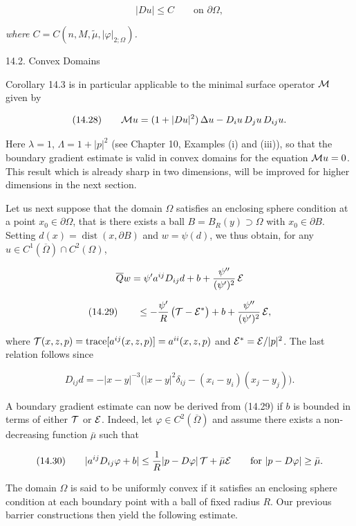 \begin{equation}
|Du| \leq C \qquad \text{on } \partial \Omega,
\tag{14.27}
\end{equation}

\emph{where $C = C(n, M, \tilde{\mu}, |\varphi|_{2;\Omega})$.}


14.2. Convex Domains

Corollary 14.3 is in particular applicable to the minimal surface operator \(\mathcal{M}\)
given by

\[
(14.28)\qquad \mathcal{M} u=(1+|Du|^2)\,\Delta u-D_i u\,D_j u\,D_{ij}u.
\]

Here \(\lambda=1\), \(\Lambda=1+|p|^2\) (see Chapter 10, Examples (i) and (iii)), so that the
boundary gradient estimate is valid in convex domains for the equation \(\mathcal{M} u=0\).
This result which is already sharp in two dimensions, will be improved for higher
dimensions in the next section.

Let us next suppose that the domain \(\Omega\) satisfies an enclosing sphere condition at
a point \(x_0\in\partial\Omega\), that is there exists a ball \(B=B_R(y)\supset\Omega\) with \(x_0\in\partial B\). Setting
\(d(x)=\operatorname{dist}(x,\partial B)\) and \(w=\psi(d)\), we thus obtain, for any \(u\in C^1(\overline{\Omega})\cap C^2(\Omega)\),

\[
\overline{Q}w=\psi' a^{ij}D_{ij}d+b+\frac{\psi''}{(\psi')^2}\,\mathcal{E}
\]

\[
(14.29)\qquad \le -\frac{\psi'}{R}\,\bigl(\mathcal{T}-\mathcal{E}^*\bigr)+b+\frac{\psi''}{(\psi')^2}\,\mathcal{E},
\]

where \(\mathcal{T}(x,z,p)=\operatorname{trace}[a^{ij}(x,z,p)]=a^{ii}(x,z,p)\) and \(\mathcal{E}^*=\mathcal{E}/|p|^2\). The last relation
follows since

\[
D_{ij}d=-|x-y|^{-3}\bigl(|x-y|^2\delta_{ij}-(x_i-y_i)(x_j-y_j)\bigr).
\]

A boundary gradient estimate can now be derived from (14.29) if \(b\) is bounded in
terms of either \(\mathcal{T}\) or \(\mathcal{E}\). Indeed, let \(\varphi\in C^2(\overline{\Omega})\) and assume there exists a non-
decreasing function \(\bar\mu\) such that

\[
(14.30)\qquad |a^{ij}D_{ij}\varphi+b|\le \frac{1}{R}|p-D\varphi|\,\mathcal{T}+\bar\mu\mathcal{E}
\qquad\text{for } |p-D\varphi|\ge \bar\mu.
\]

The domain \(\Omega\) is said to be uniformly convex if it satisfies an enclosing sphere
condition at each boundary point with a ball of fixed radius \(R\). Our previous
barrier constructions then yield the following estimate.

